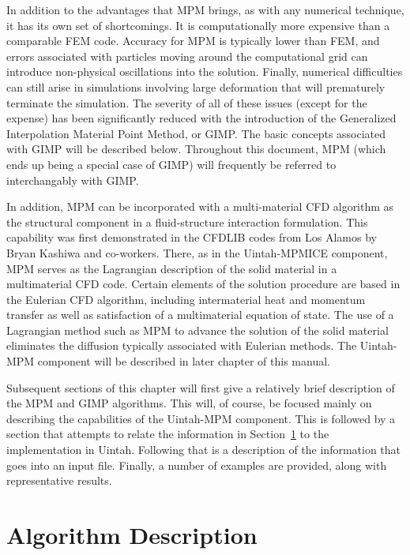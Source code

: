 In addition to the advantages that MPM brings, as with any numerical technique, it has its own set of shortcomings.  It is computationally more
expensive than a comparable FEM code.  Accuracy for MPM is typically lower
than FEM, and errors associated with particles moving around the computational
grid can introduce non-physical oscillations into the solution.  Finally,
numerical difficulties can still arise in simulations involving large
deformation that will prematurely terminate the simulation.  The severity of
all of these issues (except for the expense) has been significantly reduced
with the introduction of the Generalized Interpolation Material Point Method,
or GIMP\cite{bardgimp}.  The basic concepts associated with GIMP will be
described below.  Throughout this document, MPM (which
ends up being a special case of GIMP) will frequently be referred to
interchangably with GIMP.

In addition, MPM can be incorporated with a multi-material CFD algorithm
as the structural component in a fluid-structure interaction formulation.
This capability was first demonstrated in the CFDLIB codes from
Los Alamos by Bryan Kashiwa and co-workers\cite{kashiwa2000}.  There, as
in the Uintah-MPMICE component,
MPM serves as the Lagrangian description of the solid
material in a multimaterial CFD code.  Certain elements of the
solution procedure are based in the Eulerian CFD algorithm, including
intermaterial heat and momentum transfer as well as satisfaction
of a multimaterial equation of state.  The use of a Lagrangian method
such as MPM to advance the solution of the solid material eliminates
the diffusion typically associated with Eulerian methods.  The Uintah-MPM
component will be described in later chapter of this manual.

Subsequent sections of this chapter will first give a relatively brief
description of the MPM and GIMP algorithms.  This will, of course, be
focused mainly on describing the capabilities of the Uintah-MPM component.
This is followed by a section that attempts to relate the information in
Section~\ref{Sec:AlgDesc} to the implementation in Uintah.
Following that is a description of the information that goes into an input
file.  Finally, a number of examples are provided, along with representative
results.

\section{Algorithm Description} \label{Sec:AlgDesc}

